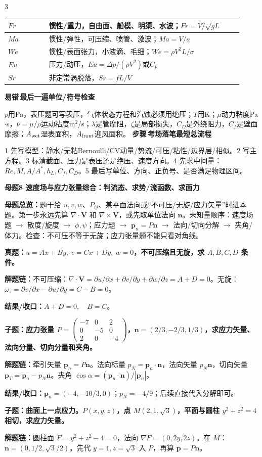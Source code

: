 \documentclass[a4paper]{article}
\newcommand{\mt}[1]{\vspace{0.45pt}\colorbox{M}{\parbox{\dimexpr\linewidth-2\fboxsep}{\color{white}\bfseries #1}}\par}
\newcommand{\qt}[1]{\vspace{0.25pt}\colorbox{Q}{\parbox{\dimexpr\linewidth-2\fboxsep}{\color{white}\bfseries #1}}\par}
\newcommand{\ans}[1]{\colorbox{G}{\parbox{\dimexpr\linewidth-2\fboxsep}{#1}}\par}
\newcommand{\chain}[1]{{\color{A}\bfseries 解题链：}#1\par}
\newcommand{\res}[1]{{\color{E}\bfseries 结果/收口：}#1\par}
\newcommand{\labtag}[3]{{\bfseries\color{#1}\colorbox{#1}{\color{white}\fontsize{2.35}{2.48}\selectfont #2}\,#3}\par}
\newcommand{\step}[1]{\labtag{S}{步骤}{#1}}
\newcommand{\err}[1]{\labtag{R}{易错}{#1}}
\newcommand{\mview}[1]{\ans{\textbf{母题总览：}#1}}
\newcommand{\stepq}[1]{\step{#1}}
\newcommand{\errq}[1]{\err{#1}}
\newenvironment{vfourWrap}{\par\begingroup\fontsize{2.68}{2.84}\selectfont\setlength{\fboxsep}{0.45pt}}{\par\endgroup}
\begin{document}
\begin{multicols}{3}
\begin{vfourWrap}
\begin{tabular}{|p{0.16\linewidth}|p{0.76\linewidth}|}
$Fr$ & 惯性/重力，自由面、船模、明渠、水波；$Fr=V/\sqrt{gL}$\\ \hline
$Ma$ & 惯性/弹性，可压缩、喷管、激波；$Ma=V/a$\\ \hline
$We$ & 惯性/表面张力，小液滴、毛细；$We=\rho V^2L/\sigma$\\ \hline
$Eu$ & 压力/动压，$Eu=\Delta p/(\rho V^2)$或$C_p$\\ \hline
$Sr$ & 非定常涡脱落，$Sr=fL/V$\\ \hline
\end{tabular}
\errq{最后一遍单位/符号检查}
$p$用Pa，表压题可写表压，气体状态方程和汽蚀必须用绝压；$T$用K；$\mu$动力粘度Pa$\cdot$s，$\nu=\mu/\rho$运动粘度m$^2$/s；$\lambda$是管摩阻，$\zeta$是局部损失，$C_D$是外绕阻力，$C_f$是壁面摩擦；$A_{\rm wet}$湿表面积，$A_{\rm front}$迎风面积。
\stepq{考场落笔最短总流程}
1 先写模型：静水/无粘Bernoulli/CV动量/势流/可压/粘性/边界层/相似。2 写主方程。3 标清截面、压力是表压还是绝压、速度方向。4 先求中间量：$Re,M,A/A^*,h_L,C_f,C_D$。5 最后写单位、方向、正负号、是否满足物理区间。
\end{vfourWrap}
\mt{母题8 速度场与应力张量综合：判流态、求势/流函数、求面力}
\mview{题干给 $u,v,w$、$P_{ij}$、某平面法向或“不可压/无旋/应力矢量”时进本题。第一步永远先算 $\nabla\cdot\bm V$ 和 $\nabla\times\bm V$，或先取单位法向 $\bm n$。未知量顺序：速度场题 $\to$ 散度/旋度 $\to$ $\phi,\psi$；应力题 $\to$ $\bm p_n=P\bm n$ $\to$ 法向/切向分解 $\to$ 夹角/体力。检查：不可压不等于无旋；应力张量题不能只看对角线。}
\qt{真题：$u=Ax+By,\ v=Cx+Dy,\ w=0$，不可压缩且无旋，求 $A,B,C,D$ 条件。}
\chain{不可压缩：$\nabla\cdot\bm V=\partial u/\partial x+\partial v/\partial y+\partial w/\partial z=A+D=0$。无旋：$\omega_z=\partial v/\partial x-\partial u/\partial y=C-B=0$。}
\res{$A+D=0,\quad B=C$。}

\qt{子题：应力张量 $P=\begin{pmatrix}-7&0&2\\0&-5&0\\2&0&-4\end{pmatrix}$，$\bm n=(2/3,-2/3,1/3)$，求应力矢量、法向分量、切向分量和夹角。}
\chain{牵引矢量 $\bm p_n=P\bm n$。法向标量 $p_N=\bm p_n\cdot\bm n$，法向矢量 $p_N\bm n$，切向矢量 $\bm p_T=\bm p_n-p_N\bm n$。夹角 $\cos\alpha=(\bm p_n\cdot\bm n)/|\bm p_n|$。}
\res{$\bm p_n=(-4,-10/3,0)$；$p_N=-4/9$；后续直接代入分解即可。}

\qt{子题：曲面上一点应力。$P(x,y,z)$，点 $M(2,1,\sqrt3)$，平面与圆柱 $y^2+z^2=4$ 相切，求应力矢量。}
\chain{圆柱面 $F=y^2+z^2-4=0$，法向 $\nabla F=(0,2y,2z)$。在 $M$：$\bm n=(0,1/2,\sqrt3/2)$。先代 $y=1,z=\sqrt3$ 入 $P$，再算 $\bm p=P\bm n$。}


\end{multicols}
\end{document}
